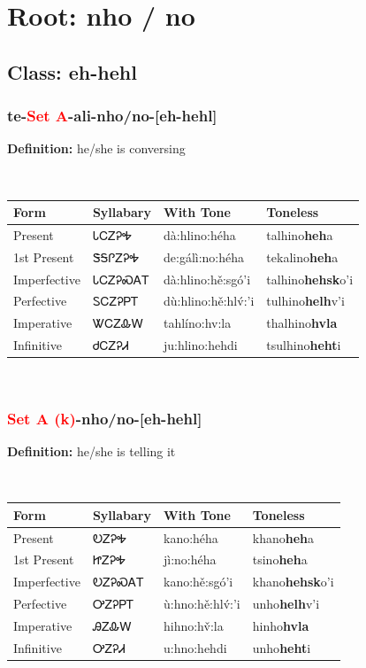 \needspace{4in}
\section*{Root: nho / no}
\nopagebreak
{}
\needspace{3in}
\subsection*{Class: eh-hehl}
\nopagebreak
\needspace{2in}
\subsubsection*{te{-}\textcolor{Red}{Set A}{-}ali{-}\textbf{nho/no}{-}[eh-hehl]}
\nopagebreak
\textbf{Definition: } he/she is conversing
\\[0.5em]
\begin{tabularx}{\textwidth}{l X X X}%
\toprule%
\textbf{Form}&\textbf{Syllabary}&\textbf{With Tone}&\textbf{Toneless}\\%
\midrule%
Present&ᏓᏟᏃᎮᎭ&dà:hlino:héha&talhino\textbf{heh}a\\%
1st Present&ᏕᎦᎵᏃᎮᎭ&de:gálì:no:héha&tekalino\textbf{heh}a\\%
Imperfective&ᏓᏟᏃᎮᏍᎪᎢ&dà:hlino:hě:sgó’i&talhino\textbf{hehsk}o'i\\%
Perfective&ᏚᏟᏃᎮᏢᎢ&dù:hlino:hě:hlv́:’i&tulhino\textbf{helh}v'i\\%
Imperative&ᏔᏟᏃᎲᎳ&tahlíno:hv:la&thalhino\textbf{hvla}\\%
Infinitive&ᏧᏟᏃᎮᏗ&ju:hlino:hehdi&tsulhino\textbf{heht}i\\%
\bottomrule%
\end{tabularx}
\\[1em]
\needspace{2in}
\subsubsection*{\textcolor{Red}{Set A (k)}{-}\textbf{nho/no}{-}[eh-hehl]}
\nopagebreak
\textbf{Definition: } he/she is telling it
\\[0.5em]
\begin{tabularx}{\textwidth}{l X X X}%
\toprule%
\textbf{Form}&\textbf{Syllabary}&\textbf{With Tone}&\textbf{Toneless}\\%
\midrule%
Present&ᎧᏃᎮᎭ&kano:héha&khano\textbf{heh}a\\%
1st Present&ᏥᏃᎮᎭ&jì:no:héha&tsino\textbf{heh}a\\%
Imperfective&ᎧᏃᎮᏍᎪᎢ&kano:hě:sgó’i&khano\textbf{hehsk}o'i\\%
Perfective&ᎤᏃᎮᏢᎢ&ù:hno:hě:hlv́:’i&unho\textbf{helh}v'i\\%
Imperative&ᎯᏃᎲᎳ&hihno:hv̌:la&hinho\textbf{hvla}\\%
Infinitive&ᎤᏃᎮᏗ&u:hno:hehdi&unho\textbf{heht}i\\%
\bottomrule%
\end{tabularx}
\\[1em]
\needspace{3in}
